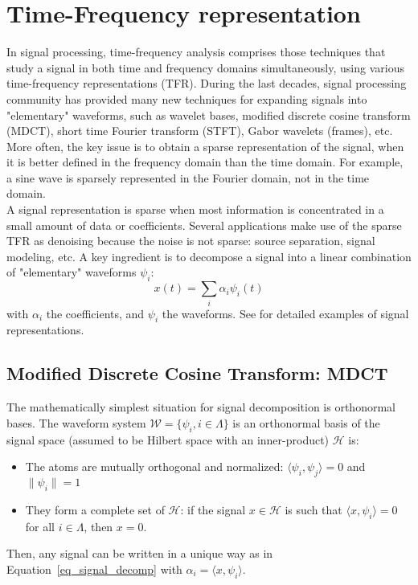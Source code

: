 \section{Time-Frequency representation}
\label{section:TF}
In signal processing, time-frequency analysis comprises those techniques that study a signal in both time and frequency domains simultaneously, using various time-frequency representations (TFR). During the last decades, signal processing community has provided many new techniques for expanding signals into "elementary" waveforms, such as wavelet bases, modified discrete cosine transform (MDCT), short time Fourier transform (STFT), Gabor wavelets (frames), etc. More often, the key issue is to obtain a sparse representation of the signal, when it is better defined in the frequency domain than the time domain. For example, a sine wave is sparsely represented in the Fourier domain, not in the time domain.\\

A signal representation is sparse when most information is concentrated in a small amount of data or coefficients. Several applications make use of the sparse TFR as denoising because the noise is not sparse: source separation, signal modeling, etc. A key ingredient is to decompose a signal into a linear combination of "elementary" waveforms $\psi_{i}$:
\begin{equation}\label{eq_signal_decomp}
x(t) = \sum_i\alpha_i\psi_i(t)
\end{equation}
with $\alpha_i$ the coefficients, and $\psi_i$ the waveforms. See \cite{mallat2008wavelet,hlawatsch1992linear,wickerhauser1994adapted} for detailed examples of signal representations.\\

\subsection{Modified Discrete Cosine Transform: MDCT}
The mathematically simplest situation for signal decomposition is orthonormal bases. The waveform system $\mathcal{W}=\{\psi_i, i \in\Lambda\}$ is an orthonormal basis of the signal space (assumed to be Hilbert space with an inner-product) $\mathcal{H}$ is:
\begin{itemize}
\item The atoms are mutually orthogonal and normalized: $\langle\psi_i,\psi_j\rangle = 0$ and $\|\psi_i\|=1$
\item They form a complete set of $\mathcal{H}$: if the signal $x\in\mathcal{H}$ is such that $\langle x,\psi_i\rangle=0$ for all $i\in\Lambda$, then $x=0$.
\end{itemize}
Then, any signal can be written in a unique way as in Equation~\eqref{eq_signal_decomp} with $\alpha_i=\langle x,\psi_i\rangle$.\\

